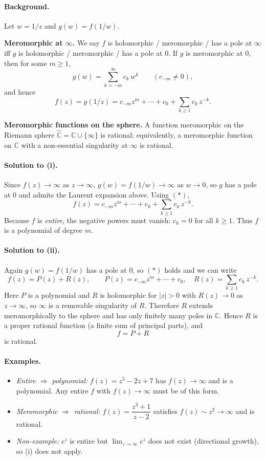 \documentclass[12pt,a4paper]{article}
\begin{document}
\bigskip

\paragraph{Background.}
Let $w=1/z$ and $g(w)=f(1/w)$.

\medskip
\textbf{Meromorphic at $\infty$.} We say $f$ is holomorphic / meromorphic / has a pole at $\infty$
iff $g$ is holomorphic / meromorphic / has a pole at $0$.
If $g$ is meromorphic at $0$, then for some $m\ge1$,
\[
g(w)=\sum_{k=-m}^{\infty} c_k\,w^k \qquad (c_{-m}\neq 0),
\]
and hence
\[
f(z)=g(1/z)=c_{-m}z^m+\cdots+c_0+\sum_{k\ge1} c_k\,z^{-k}. \tag{$\ast$}
\]

\medskip
\textbf{Meromorphic functions on the sphere.}
A function meromorphic on the Riemann sphere $\widehat{\mathbb C}=\mathbb C\cup\{\infty\}$
is rational; equivalently, a meromorphic function on $\mathbb C$ with a non-essential singularity at $\infty$ is rational.

\bigskip

\paragraph{Solution to (i).}
Since $f(z)\to\infty$ as $z\to\infty$, $g(w)=f(1/w)\to\infty$ as $w\to0$,
so $g$ has a pole at $0$ and admits the Laurent expansion above.
Using $(\ast)$,
\[
f(z)=c_{-m}z^m+\cdots+c_0+\sum_{k\ge1} c_k\,z^{-k}.
\]
Because $f$ is \emph{entire}, the negative powers must vanish:
$c_k=0$ for all $k\ge1$.
Thus $f$ is a polynomial of degree $m$.

\bigskip

\paragraph{Solution to (ii).}
Again $g(w)=f(1/w)$ has a pole at $0$, so $(\ast)$ holds and we can write
\[
f(z)=P(z)+R(z),\qquad
P(z)=c_{-m}z^m+\cdots+c_0,\quad
R(z)=\sum_{k\ge1} c_k\,z^{-k}.
\]
Here $P$ is a polynomial and $R$ is holomorphic for $|z|>0$ with $R(z)\to 0$ as $z\to\infty$,
so $\infty$ is a removable singularity of $R$.
Therefore $R$ extends meromorphically to the sphere and has only finitely many poles in $\mathbb C$.
Hence $R$ is a proper rational function (a finite sum of principal parts), and
\[
f=P+R
\]
is rational.

\bigskip

\paragraph{Examples.}
\begin{itemize}
	\item \emph{Entire $\Rightarrow$ polynomial:} $f(z)=z^5-2z+7$ has $f(z)\to\infty$ and is a polynomial.
	Any entire $f$ with $f(z)\to\infty$ must be of this form.
	\item \emph{Meromorphic $\Rightarrow$ rational:} $f(z)=\dfrac{z^3+1}{z-2}$ satisfies $f(z)\sim z^2\to\infty$ and is rational.
	\item \emph{Non-example:} $e^{z}$ is entire but $\lim_{z\to\infty}e^{z}$ does not exist (directional growth), so (i) does not apply.
\end{itemize}
\end{document}
